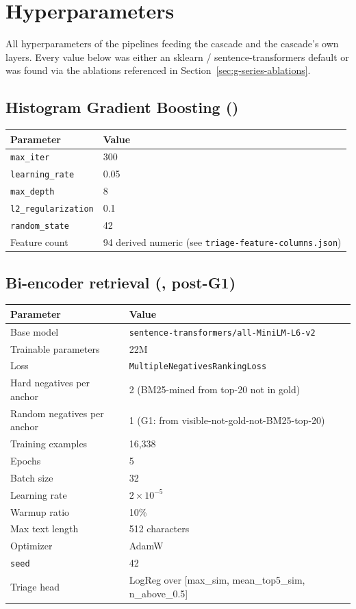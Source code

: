 \section{Hyperparameters}
\label{app:hyperparams}

All hyperparameters of the pipelines feeding the cascade and the cascade's own layers. Every value below was either an sklearn / sentence-transformers default or was found via the ablations referenced in Section~\ref{sec:g-series-ablations}.

\subsection{Histogram Gradient Boosting (\hgb{})}

\begin{table}[h]
\centering
\small
\begin{tabular}{ll}
\toprule
Parameter & Value \\
\midrule
\texttt{max\_iter} & 300 \\
\texttt{learning\_rate} & 0.05 \\
\texttt{max\_depth} & 8 \\
\texttt{l2\_regularization} & 0.1 \\
\texttt{random\_state} & 42 \\
Feature count & 94 derived numeric (see \texttt{triage-feature-columns.json}) \\
\bottomrule
\end{tabular}
\end{table}

\subsection{Bi-encoder retrieval (\bienc{}, post-G1)}

\begin{table}[h]
\centering
\small
\begin{tabular}{ll}
\toprule
Parameter & Value \\
\midrule
Base model & \texttt{sentence-transformers/all-MiniLM-L6-v2} \\
Trainable parameters & 22M \\
Loss & \texttt{MultipleNegativesRankingLoss} \\
Hard negatives per anchor & 2 (BM25-mined from top-20 not in gold) \\
Random negatives per anchor & 1 (G1: from visible-not-gold-not-BM25-top-20) \\
Training examples & 16{,}338 \\
Epochs & 5 \\
Batch size & 32 \\
Learning rate & $2 \times 10^{-5}$ \\
Warmup ratio & 10\% \\
Max text length & 512 characters \\
Optimizer & AdamW \\
\texttt{seed} & 42 \\
Triage head & LogReg over [max\_sim, mean\_top5\_sim, n\_above\_0.5] \\
\bottomrule
\end{tabular}
\end{table}

